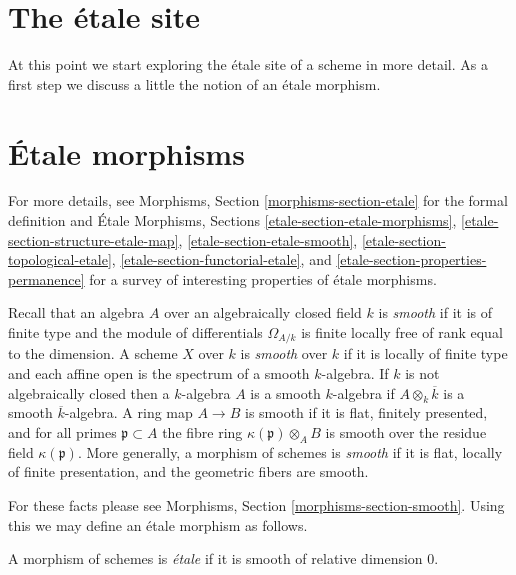 \section{The \'etale site}
\label{section-etale-site}

\noindent
At this point we start exploring the \'etale site of a scheme in
more detail. As a first step we discuss a little the notion of an
\'etale morphism.





\section{\'Etale morphisms}
\label{section-etale-morphism}

\noindent
For more details, see
Morphisms, Section \ref{morphisms-section-etale}
for the formal definition and
\'Etale Morphisms, Sections
\ref{etale-section-etale-morphisms},
\ref{etale-section-structure-etale-map},
\ref{etale-section-etale-smooth},
\ref{etale-section-topological-etale},
\ref{etale-section-functorial-etale}, and
\ref{etale-section-properties-permanence}
for a survey of interesting properties of \'etale morphisms.

\medskip\noindent
Recall that an algebra $A$ over an algebraically closed field $k$ is
{\it smooth} if it is of finite type and the module of differentials
$\Omega_{A/k}$ is finite locally free of rank equal to the dimension.
A scheme $X$ over $k$ is {\it smooth} over $k$ if it is locally of finite
type and each affine open is the spectrum of a smooth $k$-algebra.
If $k$ is not algebraically closed then a $k$-algebra $A$ is
a smooth $k$-algebra if $A \otimes_k \overline{k}$ is a smooth
$\overline{k}$-algebra. A ring map $A \to B$ is smooth if it is
flat, finitely presented, and for all primes $\mathfrak p \subset A$
the fibre ring $\kappa(\mathfrak p) \otimes_A B$ is smooth over the residue
field $\kappa(\mathfrak p)$. More generally, a morphism of schemes is
{\it smooth} if it is flat, locally of finite presentation, and the
geometric fibers are smooth.

\medskip\noindent
For these facts please see
Morphisms, Section \ref{morphisms-section-smooth}.
Using this we may define an \'etale morphism as follows.

\begin{definition}
\label{definition-etale-morphism}
A morphism of schemes is {\it \'etale} if it is smooth of relative dimension 0.
\end{definition}

